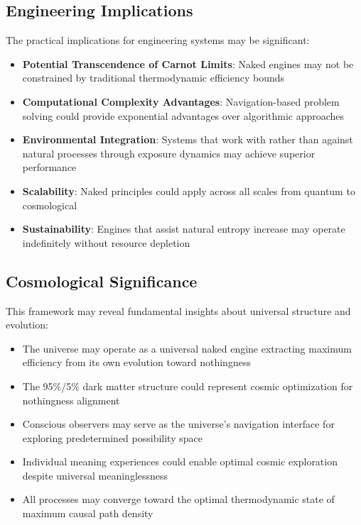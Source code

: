 \documentclass[11pt,a4paper]{article}
\theoremstyle{remark}
\begin{document}
\subsection{Engineering Implications}

The practical implications for engineering systems may be significant:

\begin{itemize}
\item \textbf{Potential Transcendence of Carnot Limits}: Naked engines may not be constrained by traditional thermodynamic efficiency bounds
\item \textbf{Computational Complexity Advantages}: Navigation-based problem solving could provide exponential advantages over algorithmic approaches
\item \textbf{Environmental Integration}: Systems that work with rather than against natural processes through exposure dynamics may achieve superior performance
\item \textbf{Scalability}: Naked principles could apply across all scales from quantum to cosmological
\item \textbf{Sustainability}: Engines that assist natural entropy increase may operate indefinitely without resource depletion
\end{itemize}

\subsection{Cosmological Significance}

This framework may reveal fundamental insights about universal structure and evolution:

\begin{itemize}
\item The universe may operate as a universal naked engine extracting maximum efficiency from its own evolution toward nothingness
\item The 95\%/5\% dark matter structure could represent cosmic optimization for nothingness alignment
\item Conscious observers may serve as the universe's navigation interface for exploring predetermined possibility space
\item Individual meaning experiences could enable optimal cosmic exploration despite universal meaninglessness
\item All processes may converge toward the optimal thermodynamic state of maximum causal path density
\end{itemize}
\end{document}
